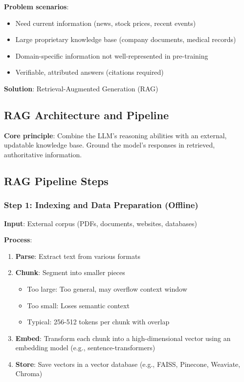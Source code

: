 \documentclass{article}
\begin{document}
\textbf{Problem scenarios}:
\begin{itemize}
\item Need current information (news, stock prices, recent events)
\item Large proprietary knowledge base (company documents, medical records)
\item Domain-specific information not well-represented in pre-training
\item Verifiable, attributed answers (citations required)
\end{itemize}

\textbf{Solution}: Retrieval-Augmented Generation (RAG)

\subsection{RAG Architecture and Pipeline}

\textbf{Core principle}: Combine the LLM's reasoning abilities with an external, updatable knowledge base. Ground the model's responses in retrieved, authoritative information.

\begin{center}
\end{center}

\subsection{RAG Pipeline Steps}

\subsubsection{Step 1: Indexing and Data Preparation (Offline)}

\textbf{Input}: External corpus (PDFs, documents, websites, databases)

\textbf{Process}:
\begin{enumerate}
\item \textbf{Parse}: Extract text from various formats
\item \textbf{Chunk}: Segment into smaller pieces
\begin{itemize}
\item Too large: Too general, may overflow context window
\item Too small: Loses semantic context
\item Typical: 256-512 tokens per chunk with overlap
\end{itemize}
\item \textbf{Embed}: Transform each chunk into a high-dimensional vector using an embedding model (e.g., sentence-transformers)
\item \textbf{Store}: Save vectors in a vector database (e.g., FAISS, Pinecone, Weaviate, Chroma)
\end{enumerate}
\end{document}
